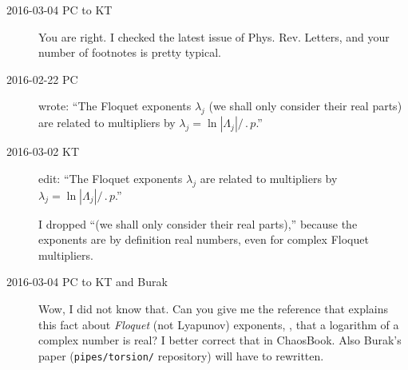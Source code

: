\begin{description}
%
%

\item[2016-03-04 PC to KT] You are right. I checked the latest issue of
Phys. Rev. Letters, and your number of footnotes is pretty typical.

\item[2016-02-22 PC] wrote:
``The Floquet exponents $\lambda_j$ (we shall only consider their real
parts) are related to multipliers by
$\lambda_j=\ln|\Lambda_j|/\period{p}$.''

\item[2016-03-02 KT] edit:
``The Floquet exponents $\lambda_j$ are related to multipliers by
$\lambda_j=\ln|\Lambda_j|/\period{p}$.''

I dropped ``(we shall only consider their real parts),'' because the
exponents are by definition real numbers, even for complex Floquet
multipliers.

\item[2016-03-04 PC to KT and Burak]
Wow, I did not know that. Can you give me the reference that explains
this fact about \emph{Floquet} (not Lyapunov) exponents, \ie, that a
logarithm of a complex number is real? I better correct that in
ChaosBook. Also Burak's paper (\texttt{pipes/torsion/}
repository) will have to rewritten.


\end{description}
